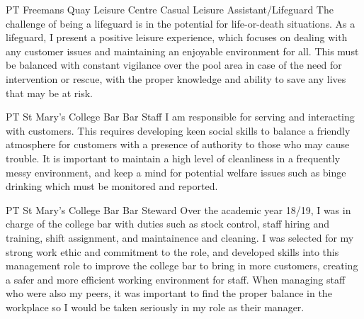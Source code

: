 \documentclass[10pt]{article} %
\begin{document}
\begin{paracol}{2}




{PT} %
{Freemans Quay Leisure Centre} %
{Casual Leisure Assistant/Lifeguard} %
{The challenge of being a lifeguard is in the potential for life-or-death situations. As a lifeguard, I present a positive leisure experience, which focuses on dealing with any customer issues and maintaining an enjoyable environment for all. This must be balanced with constant vigilance over the pool area in case of the need for intervention or rescue, with the proper knowledge and ability to save any lives that may be at risk.} %


\vspace{-10pt}
{PT} %
{St Mary's College Bar} %
{Bar Staff} %
{I am responsible for serving and interacting with customers. This requires developing keen social skills to balance a friendly atmosphere for customers with a presence of authority to those who may cause trouble. It is important to maintain a high level of cleanliness in a frequently messy environment, and keep a mind for potential welfare issues such as binge drinking which must be monitored and reported.}  %


{PT} %
{St Mary's College Bar} %
{Bar Steward} %
{Over the academic year 18/19, I was in charge of the college bar with duties such as stock control, staff hiring and training, shift assignment, and maintainence and cleaning. I was selected for my strong work ethic and commitment to the role, and developed skills into this management role to improve the college bar to bring in more customers, creating a safer and more efficient working environment for staff. When managing staff who were also my peers, it was important to find the proper balance in the workplace so I would be taken seriously in my role as their manager.} %



\end{paracol}
\end{document}
